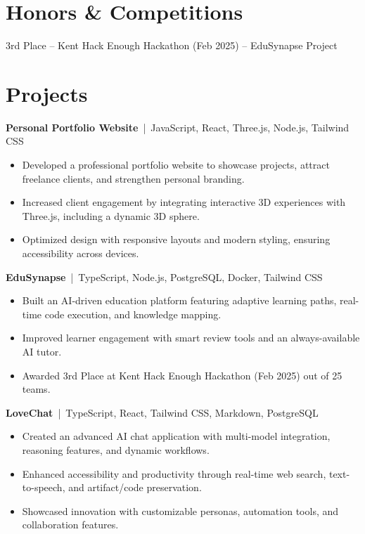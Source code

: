 \documentclass[11pt]{article}
\begin{document}
\section*{Honors \& Competitions}
3rd Place – Kent Hack Enough Hackathon (Feb 2025) – EduSynapse Project

\section*{Projects}
\textbf{Personal Portfolio Website} \,|\, JavaScript, React, Three.js, Node.js, Tailwind CSS
\begin{itemize}
  \item Developed a professional portfolio website to showcase projects, attract freelance clients, and strengthen personal branding.
  \item Increased client engagement by integrating interactive 3D experiences with Three.js, including a dynamic 3D sphere.
  \item Optimized design with responsive layouts and modern styling, ensuring accessibility across devices.
\end{itemize}

\textbf{EduSynapse} \,|\, TypeScript, Node.js, PostgreSQL, Docker, Tailwind CSS
\begin{itemize}
  \item Built an AI-driven education platform featuring adaptive learning paths, real-time code execution, and knowledge mapping.
  \item Improved learner engagement with smart review tools and an always-available AI tutor.
  \item Awarded 3rd Place at Kent Hack Enough Hackathon (Feb 2025) out of 25 teams.
\end{itemize}

\textbf{LoveChat} \,|\, TypeScript, React, Tailwind CSS, Markdown, PostgreSQL
\begin{itemize}
  \item Created an advanced AI chat application with multi-model integration, reasoning features, and dynamic workflows.
  \item Enhanced accessibility and productivity through real-time web search, text-to-speech, and artifact/code preservation.
  \item Showcased innovation with customizable personas, automation tools, and collaboration features.
\end{itemize}
\end{document}
